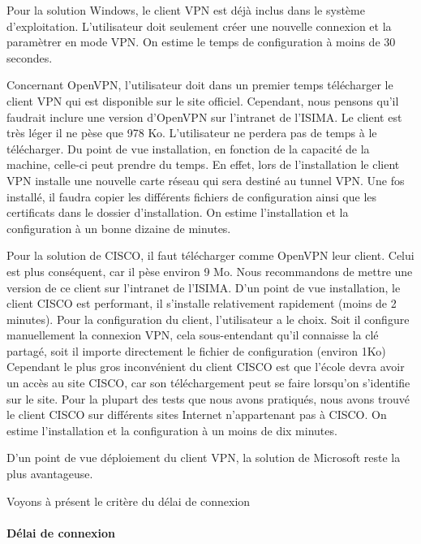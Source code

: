 Pour la solution Windows, le client VPN est déjà inclus dans le système d'exploitation. L'utilisateur doit seulement créer une nouvelle connexion et la paramètrer en mode VPN. On estime le temps de configuration à moins de 30 secondes.
~


Concernant OpenVPN, l'utilisateur doit dans un premier temps télécharger le client VPN qui est disponible sur le site officiel. Cependant, nous pensons qu'il faudrait inclure une version d'OpenVPN sur l'intranet de l'ISIMA. Le client est très léger il ne pèse que 978 Ko. L'utilisateur ne perdera pas de temps à le télécharger. Du point de vue installation, en fonction de la capacité de la machine, celle-ci peut prendre du temps. En effet, lors de l'installation le client VPN installe une nouvelle carte réseau qui sera destiné au tunnel VPN. Une fos installé, il faudra copier les différents fichiers de configuration ainsi que les certificats dans le dossier d'installation.
On estime l'installation et la configuration à un bonne dizaine de minutes.
~


Pour la solution de CISCO, il faut télécharger comme OpenVPN leur client. Celui est plus conséquent, car il pèse environ 9 Mo. Nous recommandons de mettre une version de ce client sur l'intranet de l'ISIMA. D'un point de vue installation, le client CISCO est performant, il s'installe relativement rapidement (moins de 2 minutes). Pour la configuration du client, l'utilisateur a le choix. Soit il configure manuellement la connexion VPN, cela sous-entendant qu'il connaisse la clé partagé, soit il importe directement le fichier de configuration (environ 1Ko)
Cependant le plus gros inconvénient du client CISCO est que l'école devra avoir un accès au site CISCO, car son téléchargement peut se faire lorsqu'on s'identifie sur le site. Pour la plupart des tests que nous avons pratiqués, nous avons trouvé le client CISCO sur différents sites Internet n'appartenant pas à CISCO.
On estime l'installation et la configuration à un moins de dix minutes.

D'un point de vue déploiement du client VPN, la solution de Microsoft reste la plus avantageuse. 

Voyons à présent le critère du délai de connexion  

\paragraph{Délai de connexion}
~\


